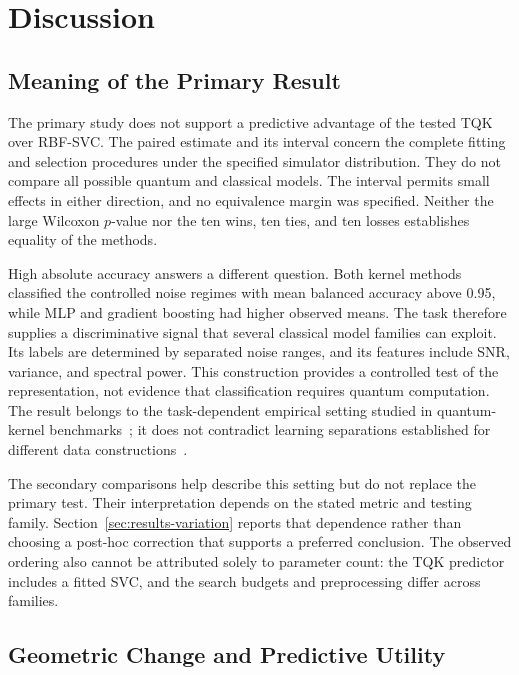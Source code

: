 \section{Discussion}
\label{sec:discussion}

\subsection{Meaning of the Primary Result}
\label{sec:discussion-primary}

The primary study does not support a predictive advantage of the tested TQK over RBF-SVC. The paired estimate and its interval concern the complete fitting and selection procedures under the specified simulator distribution. They do not compare all possible quantum and classical models. The interval permits small effects in either direction, and no equivalence margin was specified. Neither the large Wilcoxon $p$-value nor the ten wins, ten ties, and ten losses establishes equality of the methods.

High absolute accuracy answers a different question. Both kernel methods classified the controlled noise regimes with mean balanced accuracy above 0.95, while MLP and gradient boosting had higher observed means. The task therefore supplies a discriminative signal that several classical model families can exploit. Its labels are determined by separated noise ranges, and its features include SNR, variance, and spectral power. This construction provides a controlled test of the representation, not evidence that classification requires quantum computation. The result belongs to the task-dependent empirical setting studied in quantum-kernel benchmarks~\cite{alvarez2025benchmarking,schnabel2025scrutiny}; it does not contradict learning separations established for different data constructions~\cite{liu2021rigorous}.

The secondary comparisons help describe this setting but do not replace the primary test. Their interpretation depends on the stated metric and testing family. Section~\ref{sec:results-variation} reports that dependence rather than choosing a post-hoc correction that supports a preferred conclusion. The observed ordering also cannot be attributed solely to parameter count: the TQK predictor includes a fitted SVC, and the search budgets and preprocessing differ across families.

\subsection{Geometric Change and Predictive Utility}
\label{sec:discussion-geometry}

